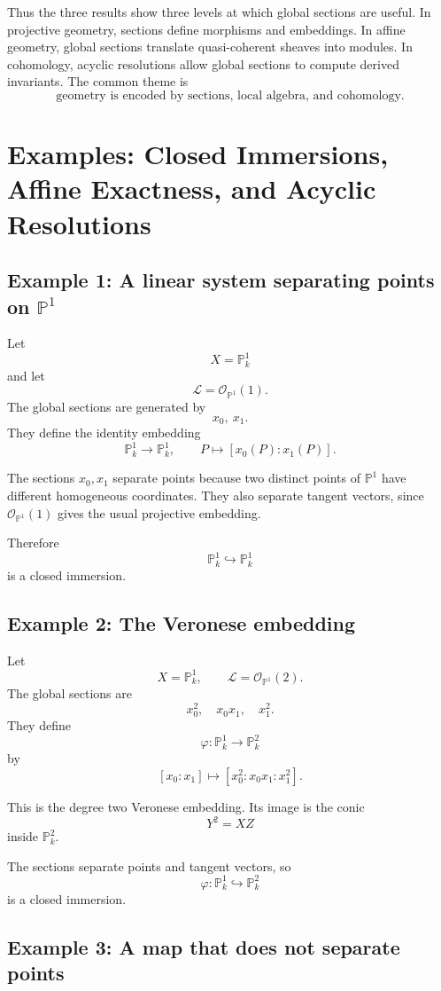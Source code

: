 \documentclass[12pt,a4paper]{article}
\theoremstyle{notespace}
\begin{document}
Thus the three results show three levels at which global sections are useful. In projective geometry, sections define morphisms and embeddings. In affine geometry, global sections translate quasi-coherent sheaves into modules. In cohomology, acyclic resolutions allow global sections to compute derived invariants. The common theme is
\[
\boxed{
	\text{geometry is encoded by sections, local algebra, and cohomology.}
}
\]

\section{Examples: Closed Immersions, Affine Exactness, and Acyclic Resolutions}

\subsection*{Example 1: A linear system separating points on \(\mathbb P^1\)}

Let
\[
X=\mathbb P^1_k
\]
and let
\[
\mathcal L=\mathcal O_{\mathbb P^1}(1).
\]
The global sections are generated by
\[
x_0,\ x_1.
\]
They define the identity embedding
\[
\mathbb P^1_k\to \mathbb P^1_k,
\qquad
P\mapsto [x_0(P):x_1(P)].
\]

The sections \(x_0,x_1\) separate points because two distinct points of \(\mathbb P^1\) have different homogeneous coordinates. They also separate tangent vectors, since \(\mathcal O_{\mathbb P^1}(1)\) gives the usual projective embedding.

Therefore
\[
\mathbb P^1_k\hookrightarrow \mathbb P^1_k
\]
is a closed immersion.

\subsection*{Example 2: The Veronese embedding}

Let
\[
X=\mathbb P^1_k,
\qquad
\mathcal L=\mathcal O_{\mathbb P^1}(2).
\]
The global sections are
\[
x_0^2,\quad x_0x_1,\quad x_1^2.
\]
They define
\[
\varphi:\mathbb P^1_k\to \mathbb P^2_k
\]
by
\[
[x_0:x_1]\mapsto [x_0^2:x_0x_1:x_1^2].
\]

This is the degree two Veronese embedding. Its image is the conic
\[
Y^2=XZ
\]
inside \(\mathbb P^2_k\).

The sections separate points and tangent vectors, so
\[
\varphi:\mathbb P^1_k\hookrightarrow \mathbb P^2_k
\]
is a closed immersion.

\subsection*{Example 3: A map that does not separate points}
\end{document}

